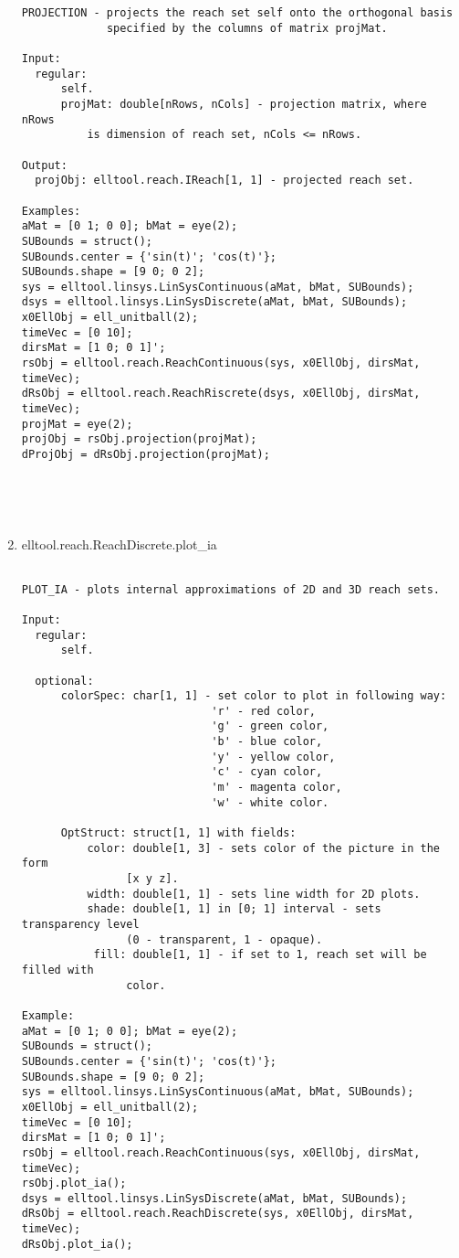 \begin{enumerate}
\begin{lstlisting}
PROJECTION - projects the reach set self onto the orthogonal basis
             specified by the columns of matrix projMat.

Input:
  regular:
      self.
      projMat: double[nRows, nCols] - projection matrix, where nRows
          is dimension of reach set, nCols <= nRows.

Output:
  projObj: elltool.reach.IReach[1, 1] - projected reach set.

Examples:
aMat = [0 1; 0 0]; bMat = eye(2);
SUBounds = struct();
SUBounds.center = {'sin(t)'; 'cos(t)'};
SUBounds.shape = [9 0; 0 2];
sys = elltool.linsys.LinSysContinuous(aMat, bMat, SUBounds);
dsys = elltool.linsys.LinSysDiscrete(aMat, bMat, SUBounds);
x0EllObj = ell_unitball(2);
timeVec = [0 10];
dirsMat = [1 0; 0 1]';
rsObj = elltool.reach.ReachContinuous(sys, x0EllObj, dirsMat, timeVec);
dRsObj = elltool.reach.ReachRiscrete(dsys, x0EllObj, dirsMat, timeVec);
projMat = eye(2);
projObj = rsObj.projection(projMat);
dProjObj = dRsObj.projection(projMat);





\end{lstlisting}
\fontfamily{\familydefault}
\selectfont
\item {elltool.reach.ReachDiscrete.plot\_ia}
\selectfont
\begin{lstlisting}

PLOT_IA - plots internal approximations of 2D and 3D reach sets.

Input:
  regular:
      self.

  optional:
      colorSpec: char[1, 1] - set color to plot in following way:
                             'r' - red color,
                             'g' - green color,
                             'b' - blue color,
                             'y' - yellow color,
                             'c' - cyan color,
                             'm' - magenta color,
                             'w' - white color.

      OptStruct: struct[1, 1] with fields:
          color: double[1, 3] - sets color of the picture in the form
                [x y z].
          width: double[1, 1] - sets line width for 2D plots.
          shade: double[1, 1] in [0; 1] interval - sets transparency level
                (0 - transparent, 1 - opaque).
           fill: double[1, 1] - if set to 1, reach set will be filled with
                color.

Example:
aMat = [0 1; 0 0]; bMat = eye(2);
SUBounds = struct();
SUBounds.center = {'sin(t)'; 'cos(t)'};
SUBounds.shape = [9 0; 0 2];
sys = elltool.linsys.LinSysContinuous(aMat, bMat, SUBounds);
x0EllObj = ell_unitball(2);
timeVec = [0 10];
dirsMat = [1 0; 0 1]';
rsObj = elltool.reach.ReachContinuous(sys, x0EllObj, dirsMat, timeVec);
rsObj.plot_ia();
dsys = elltool.linsys.LinSysDiscrete(aMat, bMat, SUBounds);
dRsObj = elltool.reach.ReachDiscrete(sys, x0EllObj, dirsMat, timeVec);
dRsObj.plot_ia();






\end{lstlisting}
\end{enumerate}
